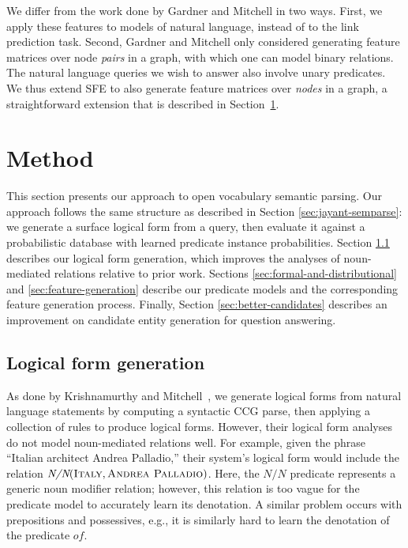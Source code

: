 \documentclass[11pt]{article}
\newcommand{\secref}[1]{Section~\ref{sec:#1}}
\newcommand{\lexicalpredicate}[1]{\ensuremath{\textit{#1}}}
\newcommand{\entity}[1]{\ensuremath{\textsc{#1}}}
\begin{document}
We differ from the work done by Gardner and Mitchell in two ways.  First, we
apply these features to models of natural language, instead of to the link
prediction task.  Second, Gardner and Mitchell only considered generating
feature matrices over node \emph{pairs} in a graph, with which one can model
binary relations.  The natural language queries we wish to answer also involve
unary predicates.  We thus extend SFE to also generate feature matrices over
\emph{nodes} in a graph, a straightforward extension that is described in
\secref{method}.

\section{Method}
\label{sec:method}

This section presents our approach to open vocabulary semantic parsing. Our
approach follows the same structure as described in Section
\ref{sec:jayant-semparse}: we generate a surface logical form from a query,
then evaluate it against a probabilistic database with learned predicate
instance probabilities. Section \ref{sec:better-lfs} describes our logical form
generation, which improves the analyses of noun-mediated relations relative to
prior work. Sections \ref{sec:formal-and-distributional} and
\ref{sec:feature-generation} describe our predicate models and the
corresponding feature generation process. Finally, Section
\ref{sec:better-candidates} describes an improvement on candidate entity
generation for question answering.

\subsection{Logical form generation}
\label{sec:better-lfs}

As done by Krishnamurthy and
Mitchell~, we generate
logical forms from natural language statements by computing a syntactic CCG
parse, then applying a collection of rules to produce logical forms. However,
their logical form analyses do not model noun-mediated relations well. For
example, given the phrase ``Italian architect Andrea Palladio,'' their system's
logical form would include the relation $\lexicalpredicate{N/N}(\entity{Italy},
\entity{Andrea Palladio})$. Here, the \lexicalpredicate{N/N} predicate
represents a generic noun modifier relation; however, this relation is too
vague for the predicate model to accurately learn its denotation. A similar
problem occurs with prepositions and possessives, e.g., it is similarly hard to
learn the denotation of the predicate \lexicalpredicate{of}.
\end{document}
